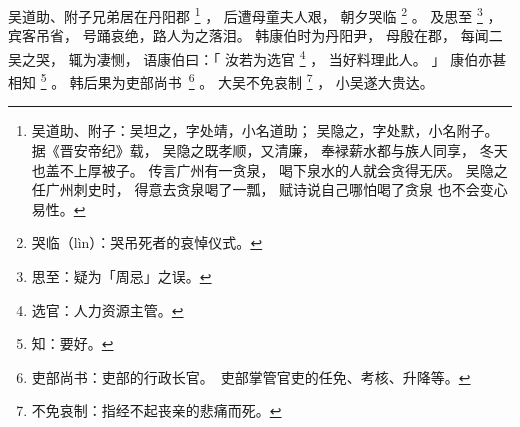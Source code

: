 
\switchcolumn*[\section{}]

吴道助、附子兄弟居在丹阳郡%
\footnote{%
    吴道助、附子：吴坦之，字处靖，小名道助；
                  吴隐之，字处默，小名附子。
                  据《晋安帝纪》载，
                  吴隐之既孝顺，又清廉，
                  奉䘵薪水都与族人同享，
                  冬天也盖不上厚被子。
                  传言广州有一贪泉，
                  喝下泉水的人就会贪得无厌。
                  吴隐之任广州刺史时，
                  得意去贪泉喝了一瓢，
                  赋诗说自己哪怕喝了贪泉
                  也不会变心易性。
}%
，
后遭母童夫人艰，
朝夕哭临%
\footnote{%
    哭临（lìn）：哭吊死者的哀悼仪式。
}%
。
及思至%
\footnote{%
    思至：疑为「周忌」之误。
}%
，
宾客吊省，
号踊哀绝，路人为之落泪。
韩康伯时为丹阳尹，
母殷在郡，
每闻二吴之哭，
辄为凄恻，
语康伯曰：「
    汝若为选官%
    \footnote{%
        选官：人力资源主管。
    }%
    ，
    当好料理此人。
」
康伯亦甚相知%
\footnote{%
    知：要好。
}%
。
韩后果为吏部尚\mbox{书%
\footnote{%
    吏部尚书：吏部的行政长官。
              吏部掌管官吏的任免、考核、升降等。
}}%
。
大吴不免哀制%
\footnote{%
    不免哀制：指经不起丧亲的悲痛而死。
}%
，
小吴遂大贵达。

\switchcolumn

%

